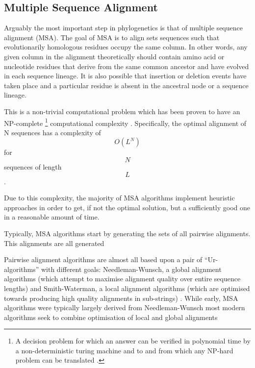 \subsection{Multiple Sequence Alignment}

Arguably the most important step in phylogenetics is that of multiple sequence
alignment (MSA).  The goal of MSA is to align sets sequences such that 
evolutionarily homologous residues occupy the same column. In other words,
any given column in the alignment theoretically should contain amino acid or nucleotide residues
that derive from the same common ancestor and have evolved in each sequence lineage.
It is also possible that insertion or deletion events have taken place
and a particular residue is absent in the ancestral node or a sequence lineage.

This is a non-trivial computational problem which has been proven to have an NP-complete
\footnote{A decision problem for which an answer can be verified in polynomial time 
    by a non-deterministic turing machine and to and from which any NP-hard problem
    can be translated \citep{Karp1972}.} computational complexity \citep{Wang1994}.
Specifically, the optimal alignment of N sequences has a complexity of \[ O(L^{N}) \]
for \[ N\] sequences of length \[ L \]\citep{Sievers2011}.

Due to this complexity, the majority of MSA algorithms implement heuristic approaches
in order to get, if not the optimal solution, but a sufficiently good one in a reasonable
amount of time. 

Typically, MSA algorithms start by generating the sets of all pairwise alignments. 
This alignments are all generated 

Pairwise alignment algorithms are almost all based upon a
pair of ``Ur-algorithms'' with different goals: 
Needleman-Wunsch, a global alignment algorithms (which attempt to maximise 
alignment quality over entire sequence lengths) \citep{Needleman1970} and Smith-Waterman, 
a local alignment algorithms (which are optimised towards producing high quality alignments
in sub-strings) \citep{Smith1981}.  While early, MSA algorithms were typically
largely derived from Needleman-Wunsch most modern algorithms seek to combine 
optimisation of local and global alignments 



